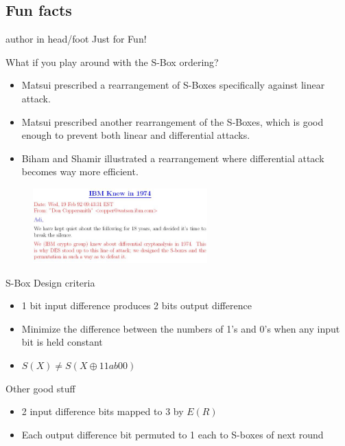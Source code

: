 \documentclass[9pt]{beamer}
\begin{document}
\subsection{Fun facts}
\begin{frame}
\begin{beamercolorbox}[ht=2.5ex,dp=1.125ex,center,rounded=true,shadow=true]{author in head/foot}
Just for Fun!
\end{beamercolorbox}
\end{frame}

\begin{frame}
What if you play around with the S-Box ordering?

\vspace{5mm}
\pause
\begin{itemize}[<+->]
\item{Matsui prescribed a rearrangement of S-Boxes specifically against linear attack.}
\item{Matsui prescribed another rearrangement of the S-Boxes, which is good enough to prevent both linear and differential attacks.}
\item{Biham and Shamir illustrated a rearrangement where differential attack becomes way more efficient.}
\end{itemize}

\end{frame}

\begin{frame}
\begin{figure}
\includegraphics[width=0.6\textwidth]{ibm.jpg}
\end{figure}

\pause
S-Box Design criteria
\begin{itemize}[<+->]
\item{1 bit input difference produces 2 bits output difference}
\item{Minimize the difference between the numbers of 1's and 0's when any input bit is held constant}
\item{$S(X) \neq S(X \oplus 11ab00)$} 
\end{itemize}

\vspace{2mm}
\pause Other good stuff
\begin{itemize}[<+->]
\item{2 input difference bits mapped to 3 by $E(R)$}
\item{Each output difference bit permuted to 1 each to S-boxes of next round}
\end{itemize}

\end{frame}
\end{document}
